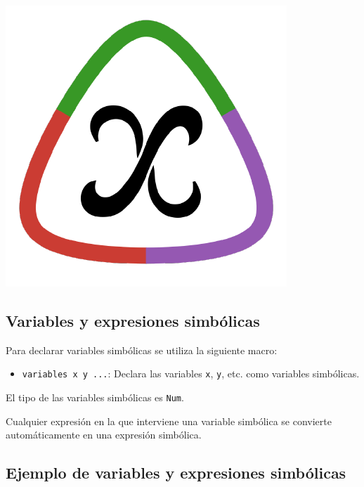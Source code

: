 \documentclass[
  letterpaper,
  DIV=11,
  numbers=noendperiod]{scrreprt}
\providecommand{\tightlist}{%
  \setlength{\itemsep}{0pt}\setlength{\parskip}{0pt}}\usepackage{longtable,booktabs,array}
\begin{document}
\includegraphics{./img/logos/juliasymbolics.png}

\hypertarget{variables-y-expresiones-simbuxf3licas}{%
\subsection{Variables y expresiones
simbólicas}\label{variables-y-expresiones-simbuxf3licas}}

Para declarar variables simbólicas se utiliza la siguiente macro:

\begin{itemize}
\tightlist
\item
  \texttt{variables\ x\ y\ ...}: Declara las variables \texttt{x},
  \texttt{y}, etc. como variables simbólicas.
\end{itemize}

El tipo de las variables simbólicas es \texttt{Num}.

Cualquier expresión en la que interviene una variable simbólica se
convierte automáticamente en una expresión simbólica.

\hypertarget{ejemplo-de-variables-y-expresiones-simbuxf3licas}{%
\subsection{Ejemplo de variables y expresiones
simbólicas}\label{ejemplo-de-variables-y-expresiones-simbuxf3licas}}
\end{document}
